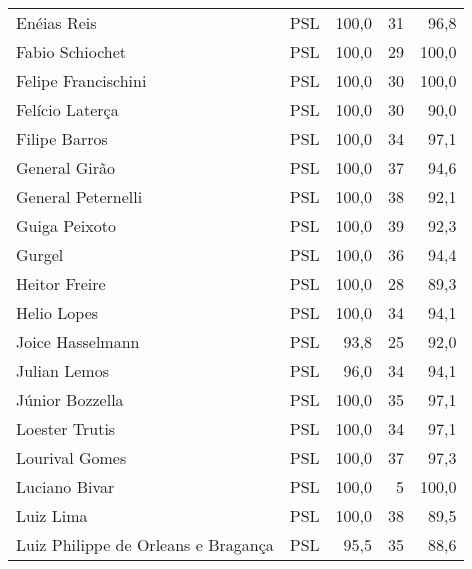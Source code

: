 \begin{longtable}{llrrr}
                         Enéias Reis &            PSL &     100,0 &           31 &       96,8 \\
                     Fabio Schiochet &            PSL &     100,0 &           29 &      100,0 \\
                 Felipe Francischini &            PSL &     100,0 &           30 &      100,0 \\
                     Felício Laterça &            PSL &     100,0 &           30 &       90,0 \\
                       Filipe Barros &            PSL &     100,0 &           34 &       97,1 \\
                       General Girão &            PSL &     100,0 &           37 &       94,6 \\
                  General Peternelli &            PSL &     100,0 &           38 &       92,1 \\
                       Guiga Peixoto &            PSL &     100,0 &           39 &       92,3 \\
                              Gurgel &            PSL &     100,0 &           36 &       94,4 \\
                       Heitor Freire &            PSL &     100,0 &           28 &       89,3 \\
                         Helio Lopes &            PSL &     100,0 &           34 &       94,1 \\
                    Joice Hasselmann &            PSL &      93,8 &           25 &       92,0 \\
                        Julian Lemos &            PSL &      96,0 &           34 &       94,1 \\
                     Júnior Bozzella &            PSL &     100,0 &           35 &       97,1 \\
                      Loester Trutis &            PSL &     100,0 &           34 &       97,1 \\
                      Lourival Gomes &            PSL &     100,0 &           37 &       97,3 \\
                       Luciano Bivar &            PSL &     100,0 &            5 &      100,0 \\
                           Luiz Lima &            PSL &     100,0 &           38 &       89,5 \\
 Luiz Philippe de Orleans e Bragança &            PSL &      95,5 &           35 &       88,6 \\

\end{longtable}
